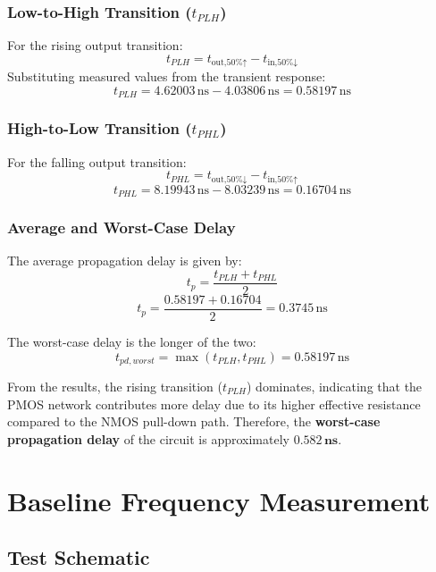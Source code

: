 \documentclass[12pt]{article}
\begin{document}
\subsubsection*{Low-to-High Transition (\(t_{PLH}\))}

For the rising output transition:
\[
t_{PLH} = t_{\text{out,50\%↑}} - t_{\text{in,50\%↓}}
\]
Substituting measured values from the transient response:
\[
t_{PLH} = 4.62003\,\text{ns} - 4.03806\,\text{ns} = 0.58197\,\text{ns}
\]

\subsubsection*{High-to-Low Transition (\(t_{PHL}\))}

For the falling output transition:
\[
t_{PHL} = t_{\text{out,50\%↓}} - t_{\text{in,50\%↑}}
\]
\[
t_{PHL} = 8.19943\,\text{ns} - 8.03239\,\text{ns} = 0.16704\,\text{ns}
\]

\subsubsection*{Average and Worst-Case Delay}

The average propagation delay is given by:
\[
t_p = \frac{t_{PLH} + t_{PHL}}{2}
\]
\[
t_p = \frac{0.58197 + 0.16704}{2} = 0.3745\,\text{ns}
\]

The worst-case delay is the longer of the two:
\[
t_{pd,worst} = \max(t_{PLH}, t_{PHL}) = 0.58197\,\text{ns}
\]

From the results, the rising transition (\(t_{PLH}\)) dominates, indicating that the PMOS network contributes more delay due to its higher effective resistance compared to the NMOS pull-down path. 
Therefore, the \textbf{worst-case propagation delay} of the circuit is approximately \(\mathbf{0.582\,ns}\).


\newpage

\section{Baseline Frequency Measurement}
\subsection{Test Schematic}
\end{document}
